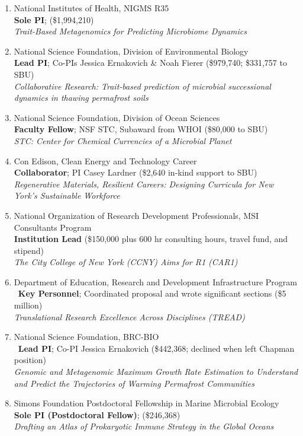 \documentclass[]{res}
\begin{document}
\begin{resume}
\begin{enumerate}
\setlength\itemsep{0.2em}
\item[2026-2031] National Institutes of Health, NIGMS R35\\
{\bf Sole PI}; (\$1,994,210)\\
\emph{Trait-Based Metagenomics for Predicting Microbiome Dynamics}
\item[2026-2029] National Science Foundation, Division of Environmental Biology\\
{\bf Lead PI}; Co-PIs Jessica Ernakovich \& Noah Fierer (\$979,740; \$331,757 to SBU)\\
\emph{Collaborative Research: Trait-based prediction of microbial successional dynamics in thawing permafrost soils}
\item[2025-2027] National Science Foundation, Division of Ocean Sciences\\
{\bf Faculty Fellow}; NSF STC, Subaward from WHOI (\$80,000 to SBU)\\
\emph{STC: Center for Chemical Currencies of a Microbial Planet}
\item[2026] Con Edison, Clean Energy and Technology Career\\
{\bf Collaborator}; PI Casey Lardner (\$2,640 in-kind support to SBU)\\
\emph{Regenerative Materials, Resilient Careers: Designing Curricula for New York’s Sustainable Workforce}
\item[2023] National Organization of Research Development Professionals, MSI Consultants Program\\
{\bf Institution Lead} (\$150,000 plus 600 hr consulting hours, travel fund, and stipend)\\
\emph{The City College of New York (CCNY) Aims for R1 (CAR1)}
\item[2023] Department of Education, Research and Development Infrastructure Program\\\
{\bf Key Personnel}; Coordinated proposal and wrote significant sections (\$5 million)\\
\emph{Translational Research Excellence Across Disciplines (TREAD)}
\item[2023 (\emph{Declined})] National Science Foundation, BRC-BIO\\\
{\bf Lead PI}; Co-PI Jessica Ernakovich (\$442,368; declined when left Chapman position)\\
\emph{Genomic and Metagenomic Maximum Growth Rate Estimation to Understand and Predict the Trajectories of Warming Permafrost Communities}
\item[2020-2023] Simons Foundation Postdoctoral Fellowship in Marine Microbial Ecology\\
{\bf Sole PI (Postdoctoral Fellow)}; (\$246,368)\\
\emph{Drafting an Atlas of Prokaryotic Immune Strategy in the Global Oceans}
\end{enumerate} 



\end{resume}
\end{document}
